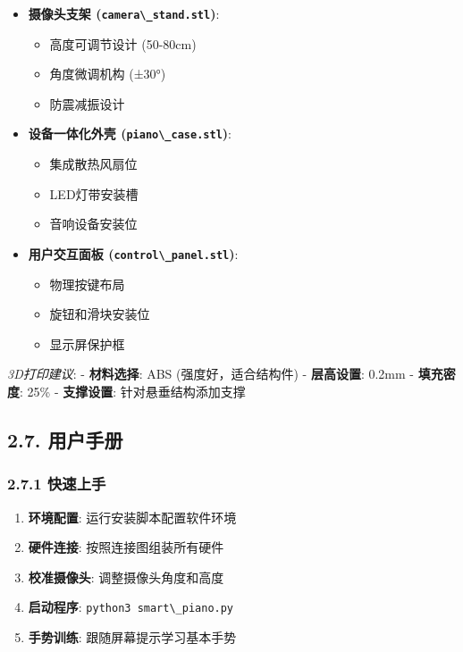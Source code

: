 \begin{itemize}
\tightlist
\item
  \textbf{摄像头支架 (\passthrough{\lstinline!camera\_stand.stl!})}:

  \begin{itemize}
  \tightlist
  \item
    高度可调节设计 (50-80cm)
  \item
    角度微调机构 (±30°)
  \item
    防震减振设计
  \end{itemize}
\item
  \textbf{设备一体化外壳 (\passthrough{\lstinline!piano\_case.stl!})}:

  \begin{itemize}
  \tightlist
  \item
    集成散热风扇位
  \item
    LED灯带安装槽
  \item
    音响设备安装位
  \end{itemize}
\item
  \textbf{用户交互面板 (\passthrough{\lstinline!control\_panel.stl!})}:

  \begin{itemize}
  \tightlist
  \item
    物理按键布局
  \item
    旋钮和滑块安装位
  \item
    显示屏保护框
  \end{itemize}
\end{itemize}

\emph{3D打印建议}: - \textbf{材料选择}: ABS (强度好，适合结构件) -
\textbf{层高设置}: 0.2mm - \textbf{填充密度}: 25\% - \textbf{支撑设置}:
针对悬垂结构添加支撑

\subsection{2.7. 用户手册}\label{ux7528ux6237ux624bux518c}

\subsubsection{2.7.1 快速上手}\label{ux5febux901fux4e0aux624b}

\begin{enumerate}
\def\labelenumi{\arabic{enumi}.}
\tightlist
\item
  \textbf{环境配置}: 运行安装脚本配置软件环境
\item
  \textbf{硬件连接}: 按照连接图组装所有硬件
\item
  \textbf{校准摄像头}: 调整摄像头角度和高度
\item
  \textbf{启动程序}: \passthrough{\lstinline!python3 smart\_piano.py!}
\item
  \textbf{手势训练}: 跟随屏幕提示学习基本手势
\end{enumerate}

